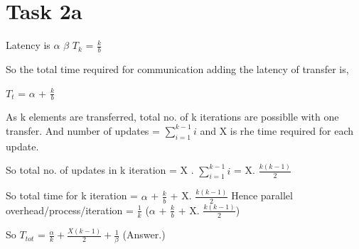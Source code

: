 \section{Task 2a} 

Latency is $\alpha$\newline
{} \newline
{} $\beta$ \newline
{}  ${T_{k}}$ = $\frac{k}{b}$

So the total time required for communication adding the latency of transfer is,

			${T_{t}}$ = $\alpha$ + $\frac{k}{b}$

As k elements are transferred, total no. of k iterations are possiblle with one transfer.\newline
And number of updates = $\sum\limits_{i = 1}^{k-1} i$  and X is rhe time required for each update.

So total no. of updates in k iteration = X . $\sum\limits_{i = 1}^{k-1} i$ =  X. $\frac{k (k-1)}{2}$

So total time for k iteration = $\alpha$ + $\frac{k}{b}$ +   X. $\frac{k (k-1)}{2}$ \newline
Hence parallel  overhead/process/iteration = $\frac{1}{k}$ ($\alpha$ + $\frac{k}{b}$ +   X. $\frac{k (k-1)}{2}$) \newline

So ${T_{tot}}$ = $\frac{\alpha}{k} + \frac{X (k-1)}{2} + \frac{1}{\beta}$ (Answer.)



